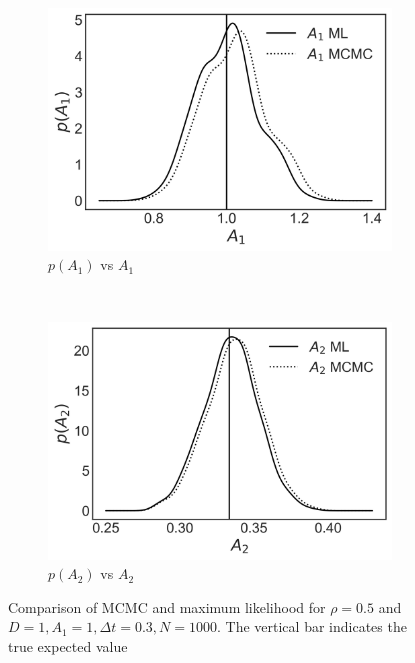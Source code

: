 \documentclass[%
 reprint,
 amsmath,amssymb,
 aps,
]{revtex4-1}
\begin{document}
\begin{figure}[H]
    \centering
    \begin{subfigure}[b]{0.4\textwidth}
        \includegraphics[width=\textwidth]{A1kde05.png}
        \caption{$p(A_{1})$ vs $A_1$}
        \label{fig:A1rho05}
    \end{subfigure}
    ~ %
    \begin{subfigure}[b]{0.4\textwidth}
        \includegraphics[width=\textwidth]{A2kde05.png}
        \caption{$p(A_{2})$ vs $A_2$}
        \label{fig:A2rho05}
    \end{subfigure}
    \caption{Comparison of MCMC and maximum likelihood for $\rho=0.5$ and $D=1,A_{1}=1,\Delta t = 0.3,N=1000$.  The vertical bar indicates the true expected value}\label{fig:Arho05}
\end{figure}
\end{document}
